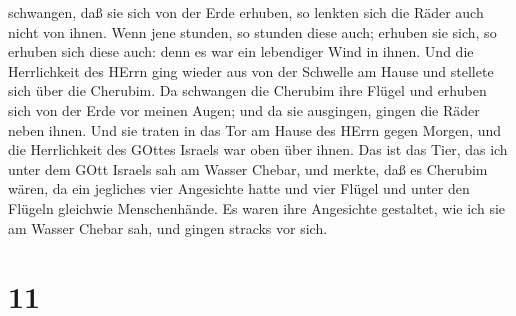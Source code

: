schwangen, daß sie sich von der Erde erhuben, so lenkten sich die Räder
auch nicht von ihnen.  Wenn jene stunden, so stunden diese
auch; erhuben sie sich, so erhuben sich diese auch: denn es war ein
lebendiger Wind in ihnen.  Und die Herrlichkeit des HErrn
ging wieder aus von der Schwelle am Hause und stellete sich über die
Cherubim.  Da schwangen die Cherubim ihre Flügel und
erhuben sich von der Erde vor meinen Augen; und da sie ausgingen, gingen
die Räder neben ihnen. Und sie traten in das Tor am Hause des HErrn
gegen Morgen, und die Herrlichkeit des GOttes Israels war oben über
ihnen.  Das ist das Tier, das ich unter dem GOtt Israels
sah am Wasser Chebar, und merkte, daß es Cherubim wären, 
da ein jegliches vier Angesichte hatte und vier Flügel und unter den
Flügeln gleichwie Menschenhände.  Es waren ihre Angesichte
gestaltet, wie ich sie am Wasser Chebar sah, und gingen stracks vor
sich.

\hypertarget{section-10}{%
\section{11}\label{section-10}}

